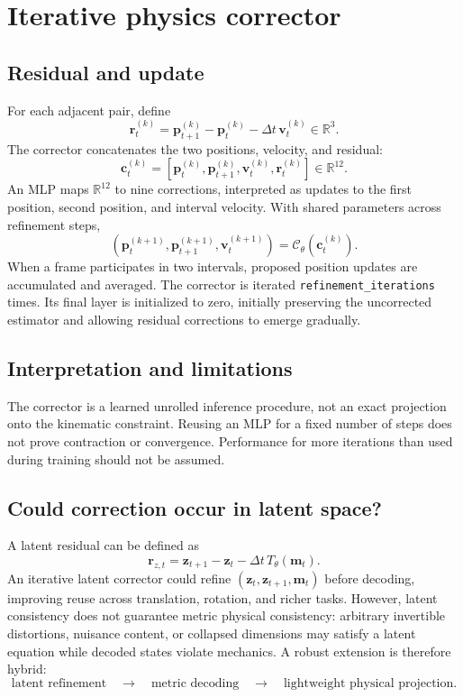 \documentclass[11pt,a4paper]{article}
\newcommand{\R}{\mathbb{R}}\newcommand{\norm}[1]{\left\lVert #1\right\rVert}\newcommand{\E}{\mathbb{E}}\newcommand{\dt}{\Delta t}
\begin{document}
\section{Iterative physics corrector}
\subsection{Residual and update}
For each adjacent pair, define
\begin{equation}
\bm r_t^{(k)}=\bm p_{t+1}^{(k)}-\bm p_t^{(k)}-\dt\,\bm v_t^{(k)}\in\R^3.
\end{equation}
The corrector concatenates the two positions, velocity, and residual:
\begin{equation}
\bm c_t^{(k)}=\left[\bm p_t^{(k)},\bm p_{t+1}^{(k)},\bm v_t^{(k)},\bm r_t^{(k)}\right]\in\R^{12}.
\end{equation}
An MLP maps $\R^{12}$ to nine corrections, interpreted as updates to the first position, second position, and interval velocity. With shared parameters across refinement steps,
\begin{equation}
(\bm p_t^{(k+1)},\bm p_{t+1}^{(k+1)},\bm v_t^{(k+1)})=\mathcal C_\theta(\bm c_t^{(k)}).
\end{equation}
When a frame participates in two intervals, proposed position updates are accumulated and averaged. The corrector is iterated \texttt{refinement\_iterations} times. Its final layer is initialized to zero, initially preserving the uncorrected estimator and allowing residual corrections to emerge gradually.

\subsection{Interpretation and limitations}
The corrector is a learned unrolled inference procedure, not an exact projection onto the kinematic constraint. Reusing an MLP for a fixed number of steps does not prove contraction or convergence. Performance for more iterations than used during training should not be assumed.

\subsection{Could correction occur in latent space?}
A latent residual can be defined as
\begin{equation}
\bm r_{z,t}=\bm z_{t+1}-\bm z_t-\dt\,T_\theta(\bm m_t).
\end{equation}
An iterative latent corrector could refine $(\bm z_t,\bm z_{t+1},\bm m_t)$ before decoding, improving reuse across translation, rotation, and richer tasks. However, latent consistency does not guarantee metric physical consistency: arbitrary invertible distortions, nuisance content, or collapsed dimensions may satisfy a latent equation while decoded states violate mechanics. A robust extension is therefore hybrid:
\begin{equation}
\text{latent refinement}\quad\longrightarrow\quad\text{metric decoding}\quad\longrightarrow\quad\text{lightweight physical projection}.
\end{equation}
\end{document}
